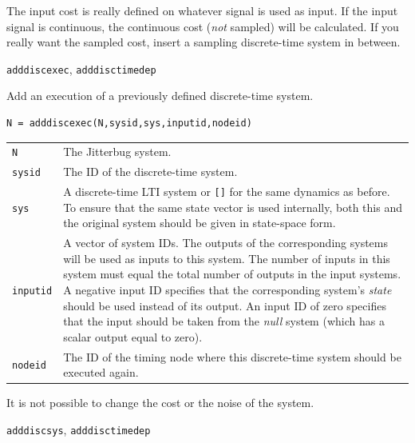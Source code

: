 \documentclass[final,twoside]{rapport}  %
\begin{document}
The input cost is really defined on whatever signal is used
as input. If the input signal is continuous, the continuous cost
({\em not} sampled) will be calculated. If you really want the sampled
cost, insert a sampling discrete-time system in between.

\seealso
{\tt adddiscexec}, {\tt adddisctimedep}


\label{sec:adddiscexec}

\purpose
Add an execution of a previously defined discrete-time system.

\syntax
\begin{verbatim}
N = adddiscexec(N,sysid,sys,inputid,nodeid)
\end{verbatim}

\args
\begin{tabularx}{\hsize}{l>{\raggedright\arraybackslash}X}
{\tt N} &  The {\sc Jitterbug} system.\\
{\tt sysid} &  The ID of the discrete-time system.\\
{\tt sys} &  A discrete-time LTI system or {\tt []} for the same dynamics
as before. To ensure that the same state vector is used
internally, both this and the original system should be given in
state-space form. \\
{\tt inputid} & A vector of system IDs. The outputs of the corresponding
          systems will be used as inputs to this system. The number
          of inputs in this system must equal the total number of
          outputs in the input systems. A negative input ID
          specifies that the corresponding system's {\em state} should
          be used instead of its output. An input ID of zero
          specifies that the input should be taken from the {\em null}
          system (which has a scalar output equal to zero).\\
{\tt nodeid} & The ID of the timing node where this discrete-time
system should be executed again.
\end{tabularx}

\remark
It is not possible to change the cost or the noise of the
system.

\seealso 
{\tt adddiscsys}, {\tt adddisctimedep}


\label{sec:adddisctimedep}
\end{document}
